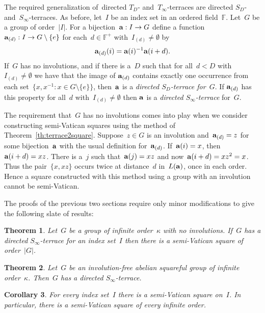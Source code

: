 \documentclass[12pt,a4paper]{article}
\newtheorem{thm}{Theorem}[section]
\newtheorem{cor}[thm]{Corollary}
\newcommand{\F}{\mathbb{F}}
\begin{document}
The required generalization of~directed $T_{D}$- and~$T_{\infty}$-terraces are directed $S_{D}$- and~$S_{\infty}$-terraces.  As before, let~$I$ be an index set in an ordered field~$\F$.  Let~$G$ be a group of order~$|I|$.  For a bijection~${\bf a}: I \rightarrow G$ define a function~${\bf a}_{(d)}: I \rightarrow G \setminus \{ e \}$ for each~$d \in \F^+$ with~$I_{(d)} \neq \emptyset$ by
$${\bf a}_{(d)}(i) = {\bf a}(i)^{-1}{\bf a}(i+d).$$
If~$G$ has no involutions, and if there is a~$D$ such that for all~$d < D$ with~$I_{(d)} \neq \emptyset$ we have that the image of ${\bf a}_{(d)}$ contains exactly one occurrence from each set~$\{ x,x^{-1} : x \in G\setminus \{e\} \}$, then~${\bf a}$ is a {\em directed $S_D$-terrace for~$G$}.  If ${\bf a}_{(d)}$ has this property for all~$d$ with~$I_{(d)} \neq \emptyset$ then ${\bf a}$ is  a {\em directed $S_{\infty}$-terrace} for~$G$.

The requirement that~$G$ has no involutions comes into play when we consider constructing semi-Vatican squares using the method of Theorem~\ref{th:terrace2square}.  Suppose~$z \in G$ is an involution and~${\bf a}_{(d)} = z$ for some bijection~${\bf a}$ with the usual definition for~${\bf a}_{(d)}$.  If~${\bf a}(i) = x$, then ${\bf a}(i+d) = xz$.  There is a~$j$ such that~${\bf a}(j) = xz$ and now~${\bf a}(i+d) = xz^2 = x$.  Thus the pair~$\{ x, xz \}$ occurs twice at distance~$d$ in~$L({\bf a})$, once in each order.  Hence a square constructed with this method using a group with an involution cannot be semi-Vatican.



The proofs of the previous two sections require only minor modifications to give the following slate of results:

\begin{thm}\label{th:semi_terrace2square}
Let~$G$ be a group of infinite order~$\kappa$ with no involutions.  If~$G$ has a directed $S_{\infty}$-terrace for an index set~$I$ then there is a semi-Vatican square of order~$|G|$.
\end{thm}

\begin{thm}\label{th:semi_T_infty}
Let~$G$ be an involution-free abelian squareful group of infinite order~$\kappa$.   Then~$G$ has a directed $S_{\infty}$-terrace.
\end{thm}

\begin{cor}\label{cor:semi_vatsquares}
For every index set~$I$ there is a semi-Vatican square on~$I$.  In particular, there is a semi-Vatican square of every infinite order.
\end{cor}
\end{document}
